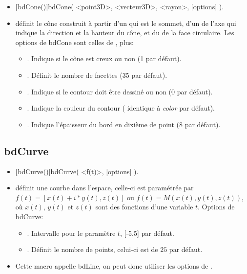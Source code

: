 \begin{itemize}
 \item \util \textbf[bdCone()]{bdCone( <point3D>, <vecteur3D>, <rayon>, [options] )}.
 \item \desc définit le cône construit à partir d'un  qui est le sommet, d'un  de l'axe qui indique la direction et la hauteur du cône, et du  de la face circulaire. Les options de bdCone sont celles de , plus:

  \begin{itemize}
   \item {}. Indique si le cône est creux ou non (1 par défaut).
   \item {}. Définit le nombre de facettes (35 par défaut).
   \item {}. Indique si le contour doit être dessiné ou non (0 par défaut).
   \item {}. Indique la couleur du contour ( identique à \textit{color} par défaut).
   \item {}. Indique l'épaisseur du bord en dixième de point ($8$ par défaut).
  \end{itemize}
\end{itemize}

\subsection{bdCurve}\label{macbdCurve}

\begin{itemize}
 \item \util \textbf[bdCurve()]{bdCurve( <f(t)>, [options] )}.
 \item \desc définit une courbe dans l'espace, celle-ci est paramétrée par $f(t)=[x(t)+i*y(t), z(t)]$ ou
$f(t)=M(x(t),y(t),z(t))$, où $x(t)$, $y(t)$ et $z(t)$ sont des fonctions d'une variable $t$. Options de bdCurve: 

  \begin{itemize}
  \item {}. Intervalle pour le paramètre $t$, [-5,5] par défaut.
  \item {}. Définit le nombre de points, celui-ci est de $25$ par défaut.
  \end{itemize}
 \item Cette macro appelle bdLine, on peut donc utiliser les options de .
\end{itemize}


